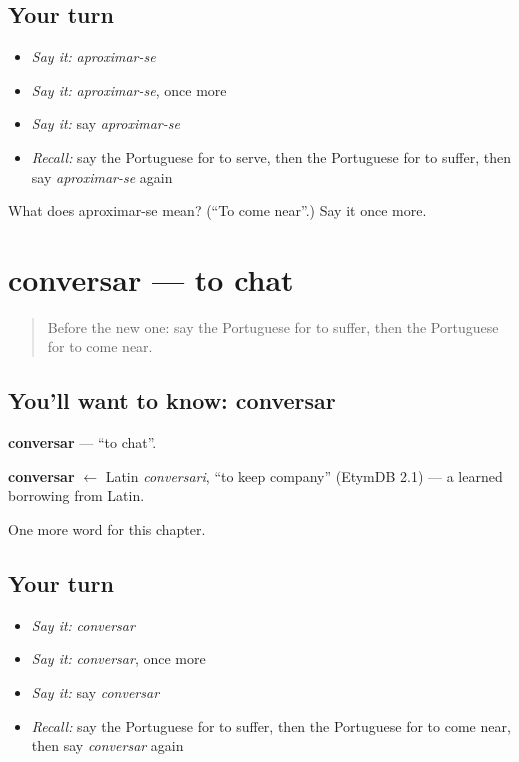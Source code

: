 \subsection*{Your turn}
\begin{itemize}
\raggedright
  \item \emph{Say it:} \emph{aproximar-se}
  \item \emph{Say it:} \emph{aproximar-se}, once more
  \item \emph{Say it:} say \emph{aproximar-se}
  \item \emph{Recall:} say the Portuguese for to serve, then the Portuguese for to suffer, then say \emph{aproximar-se} again
\end{itemize}

\begin{tcolorbox}[breakable,colback=teal!4,colframe=teal!35!black,title={Before you move on}]
What does aproximar-se mean? (\textquotedblleft{}To come near\textquotedblright{}.) Say it once more.
\end{tcolorbox}
\section[conversar]{conversar — to chat}

\label{lesson:PT-C207-conversar}



\begin{quote}
Before the new one: say the Portuguese for to suffer, then the Portuguese for to come near.
\end{quote}

\subsection*{You'll want to know: conversar}
\textbf{conversar} — \textquotedblleft{}to chat\textquotedblright{}.

\begin{cousinweb}
\textbf{conversar} $\leftarrow$ Latin \emph{conversari}, \textquotedblleft{}to keep company\textquotedblright{} (EtymDB 2.1) — a learned borrowing from Latin.
\end{cousinweb}

\begin{grammarlens}[title={What you've built}]
One more word for this chapter.
\end{grammarlens}

\subsection*{Your turn}
\begin{itemize}
\raggedright
  \item \emph{Say it:} \emph{conversar}
  \item \emph{Say it:} \emph{conversar}, once more
  \item \emph{Say it:} say \emph{conversar}
  \item \emph{Recall:} say the Portuguese for to suffer, then the Portuguese for to come near, then say \emph{conversar} again
\end{itemize}

